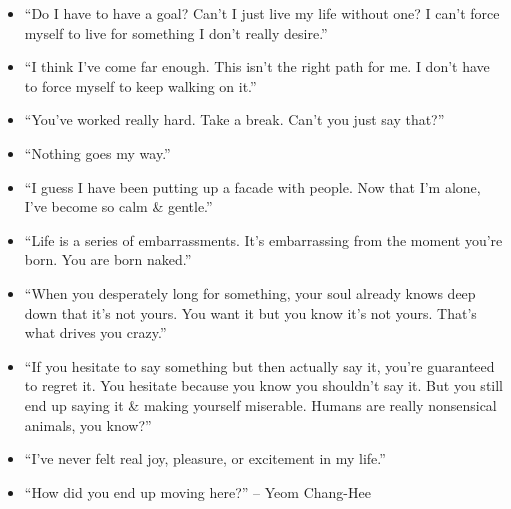 \documentclass{article}
\begin{document}
\begin{enumerate}
\begin{itemize}
		\item ``Do I have to have a goal? Can't I just live my life without one? I can't force myself to live for something I don't really desire.''
		\item ``I think I've come far enough. This isn't the right path for me. I don't have to force myself to keep walking on it.''
		\item ``You've worked really hard. Take a break. Can't you just say that?''
		\item ``Nothing goes my way.''
		\item ``I guess I have been putting up a facade with people. Now that I'm alone, I've become so calm \& gentle.''
		\item ``Life is a series of embarrassments. It's embarrassing from the moment you're born. You are born naked.''
		\item ``When you desperately long for something, your soul already knows deep down that it's not yours. You want it but you know it's not yours. That's what drives you crazy.''
		\item ``If you hesitate to say something but then actually say it, you're guaranteed to regret it. You hesitate because you know you shouldn't say it. But you still end up saying it \& making yourself miserable. Humans are really nonsensical animals, you know?''
		\item ``I've never felt real joy, pleasure, or excitement in my life.''
		\item ``How did you end up moving here?'' -- Yeom Chang-Hee


\end{itemize}
\end{enumerate}
\end{document}
